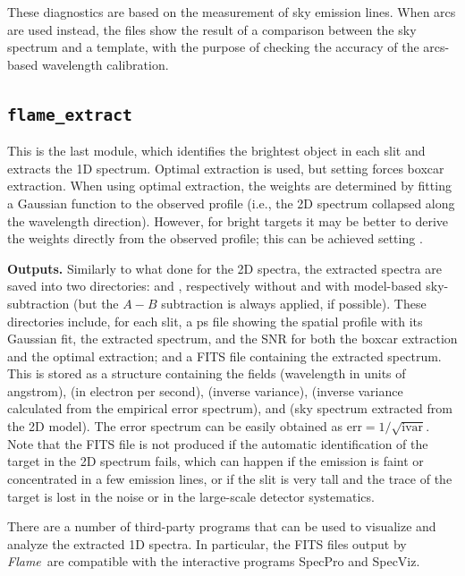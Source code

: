 \documentclass[a4paper]{article}
\newcommand{\flame}{\emph{Flame}}
\begin{document}
\begin{sloppypar}
These diagnostics are based on the measurement of sky emission lines. When arcs are used instead, the files show the result of a comparison between the sky spectrum and a template, with the purpose of checking the accuracy of the arcs-based wavelength calibration.



\subsection{\texttt{flame\_extract}}

This is the last module, which identifies the brightest object in each slit and extracts the 1D spectrum. Optimal extraction is used, but setting  forces boxcar extraction. When using optimal extraction, the weights are determined by fitting a Gaussian function to the observed profile (i.e., the 2D spectrum collapsed along the wavelength direction). However, for bright targets it may be better to derive the weights directly from the observed profile; this can be achieved setting .

\medskip
\noindent
\textbf{Outputs.} Similarly to what done for the 2D spectra, the extracted spectra are saved into two directories:  and , respectively without and with model-based sky-subtraction (but the $A-B$ subtraction is always applied, if possible). These directories include, for each slit, a ps file showing the spatial profile with its Gaussian fit, the extracted spectrum, and the SNR for both the boxcar extraction and the optimal extraction; and a FITS file containing the extracted spectrum. This is stored as a structure containing the fields  (wavelength in units of angstrom),  (in electron per second),  (inverse variance),  (inverse variance calculated from the empirical error spectrum), and  (sky spectrum extracted from the 2D model). The error spectrum can be easily obtained as $\mathrm{err} = 1/\sqrt{\mathrm{ivar}}$. Note that the FITS file is not produced if the automatic identification of the target in the 2D spectrum fails, which can happen if the emission is faint or concentrated in a few emission lines, or if the slit is very tall and the trace of the target is lost in the noise or in the large-scale detector systematics.

There are a number of third-party programs that can be used to visualize and analyze the extracted 1D spectra. In particular, the FITS files output by \flame\ are compatible with the interactive programs SpecPro and SpecViz.


\end{sloppypar}
\end{document}

